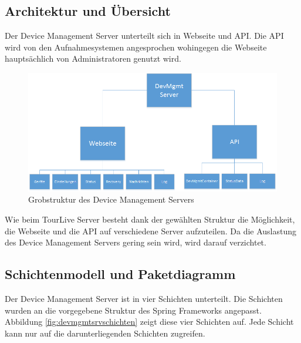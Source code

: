 \subsection{Architektur und Übersicht}
Der Device Management Server unterteilt sich in Webseite und API. Die API wird von den Aufnahmesystemen angesprochen wohingegen die Webseite hauptsächlich von Administratoren genutzt wird.

\begin{figure}[H]
	\centering
	\includegraphics[width=130mm]{images/devmgmtsrv/uebersicht.png}
	\caption{Grobstruktur des Device Management Servers}
\end{figure}

Wie beim TourLive Server besteht dank der gewählten Struktur die Möglichkeit, die Webseite und die API auf verschiedene Server aufzuteilen. Da die Auslastung des Device Management Servers gering sein wird, wird darauf verzichtet.

\subsection{Schichtenmodell und Paketdiagramm}
Der Device Management Server ist in vier Schichten unterteilt. Die Schichten wurden an die vorgegebene Struktur des Spring Frameworks angepasst. Abbildung \ref{fig:devmgmtsrvschichten} zeigt diese vier Schichten auf. Jede Schicht kann nur auf die darunterliegenden Schichten zugreifen.

